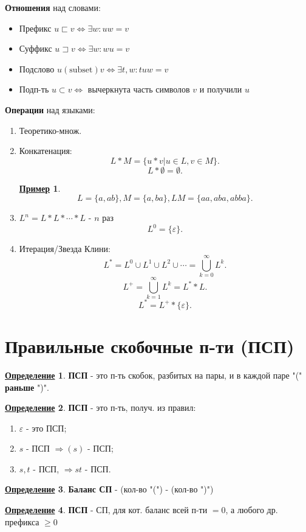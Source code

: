 \documentclass[12pt]{article}
\newtheorem*{example}{\underline{Пример}}
\theoremstyle{definition}
\newtheorem{definition}{\underline{Определение}}[section]
\theoremstyle{definition}
\begin{document}
\textbf{Отношения} над словами:
\begin{itemize}
    \item Префикс $u \sqsubset v \iff \exists w \colon uw = v$ 
    \item Суффикс $u \sqsupset v \iff \exists w \colon wu = v$
    \item Подслово $u (\text{subset}) v \iff \exists t, w \colon tuw = v$
    \item Подп-ть $u \subset v \iff$ вычеркнута часть символов $v$ и получили $u$
\end{itemize}

\textbf{Операции} над языками:
\begin{enumerate}
    \item [0) ] Теоретико-множ.
    \item [1) ] Конкатенация:
        \[
        L * M = \{u * v | u \in L, v \in M\}
        .\] 
        \[
        L * \emptyset = \emptyset
        .\] 
        \begin{example}
        \[
        L = \{a, ab\}, M = \{a, ba\}, LM = \{aa, aba, abba\}
        .\] 
        \end{example}

    \item [2) ] $L^{n} = L * L * \cdots * L$ - $n$ раз
        \[
        L^{0} = \{\varepsilon\} 
        .\] 
    \item [3) ] Итерация/Звезда Клини:
        \[
        L^{*} = L^{0} \cup L^{1} \cup L^{2} \cup \cdots = \bigcup_{k = 0}^{\infty} L^{k} 
        .\] 
        \[
        L^{+} = \bigcup_{k = 1}^{\infty} L^{k} = L^{*} * L
        .\] 
        \[
        L^{*} = L^{+} * \{\varepsilon\} 
        .\] 
        
\end{enumerate}

\section{Правильные скобочные п-ти (ПСП)}

\begin{definition}
    \textbf{ПСП} - это п-ть скобок, разбитых на пары, и в каждой паре "(" \textbf{раньше} ")".
\end{definition}
\begin{definition}
    \textbf{ПСП} - это п-ть, получ. из правил:
    \begin{enumerate}
        \item $\varepsilon$ - это ПСП;
        \item $s$ - ПСП $\Rightarrow (s)$ - ПСП;
        \item $s, t$ -  ПСП, $\Rightarrow st$ - ПСП.
    \end{enumerate}
\end{definition}
\begin{definition}
\textbf{Баланс СП} - (кол-во "(") - (кол-во ")")
\end{definition}
\begin{definition}
    \textbf{ПСП} - СП, для кот. баланс всей п-ти $ = 0$, а любого др. префикса $ \geq 0$
\end{definition}
\end{document}
